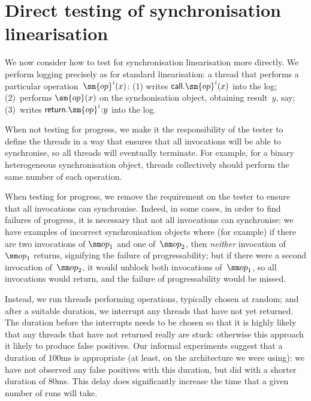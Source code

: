 \section{Direct testing of synchronisation linearisation}
\label{sec:direct}

We now consider how to test for synchronisation linearisation more directly.
We perform logging precisely as for standard linearisation: a thread that
performs a particular operation~$\sm{op}^i(x)$: (1) writes
$\call.\sm{op}^i(x)$ into the log; (2)~performs $\sm{op}(x)$ on the
synchonisation object, obtaining result~$y$, say; (3)~writes
$\return.\sm{op}^i \:: y$ into the log.  

When not testing for progress, we make it the responsibility of the tester to
define the threads in a way that ensures that all invocations will be able to
synchronise, so all threads will eventually terminate.  For example, for a
binary heterogeneous synchronisation object, threads collectively should
perform the same number of each operation. 

When testing for progress, we remove the requirement on the tester to ensure
that all invocations can synchronise.  Indeed, in some cases, in order to find
failures of progress, it is necessary that not all invocations can
synchronise: we have examples of incorrect synchronisation objects where (for
example) if there are two invocations of $\op_1$ and one of~$\op_2$, then
\emph{neither} invocation of~$\op_1$ returns, signifying the failure of
progressability; but if there were a second invocation of~$\op_2$, it would
unblock both invocations of~$\op_1$, so all invocations would return, and the
failure of progressability would be missed.

Instead, we run threads performing operations, typically chosen at random; and
after a suitable duration, we interrupt any threads that have not yet
returned.  The duration before the interrupts needs to be chosen so that it is
highly likely that any threads that have not returned really are stuck:
otherwise this approach it likely to produce false positives.  Our informal
experiments suggest that a duration of 100ms is appropriate (at least, on the
architecture we were using): we have not observed any false positives with
this duration, but did with a shorter duration of 80ms.  This delay does
significantly increase the time that a given number of runs will take.


